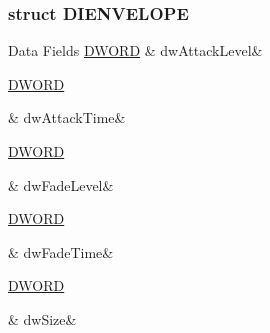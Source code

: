 \subsubsection{struct D\-I\-E\-N\-V\-E\-L\-O\-P\-E}
\begin{DoxyFields}{Data Fields}
\hypertarget{a00003_a557ca29f144d959ad65bc2cb8bd51ada}{\hyperlink{a00003_a50e15ae51c87ae06ab29c8148cb5f36c}{D\-W\-O\-R\-D}}\label{a00003_a557ca29f144d959ad65bc2cb8bd51ada}
&
dw\-Attack\-Level&
\\
\hline

\hypertarget{a00003_ae7e9a81a01a15d6ea942b8c16df1302a}{\hyperlink{a00003_a50e15ae51c87ae06ab29c8148cb5f36c}{D\-W\-O\-R\-D}}\label{a00003_ae7e9a81a01a15d6ea942b8c16df1302a}
&
dw\-Attack\-Time&
\\
\hline

\hypertarget{a00003_ad212adb36fad0fae025e1089455618a0}{\hyperlink{a00003_a50e15ae51c87ae06ab29c8148cb5f36c}{D\-W\-O\-R\-D}}\label{a00003_ad212adb36fad0fae025e1089455618a0}
&
dw\-Fade\-Level&
\\
\hline

\hypertarget{a00003_a92f5b1007dcd74e75beaafbb07f91ba8}{\hyperlink{a00003_a50e15ae51c87ae06ab29c8148cb5f36c}{D\-W\-O\-R\-D}}\label{a00003_a92f5b1007dcd74e75beaafbb07f91ba8}
&
dw\-Fade\-Time&
\\
\hline

\hypertarget{a00003_a669c5a85f5a9eb97e64ad880fadaaa2d}{\hyperlink{a00003_a50e15ae51c87ae06ab29c8148cb5f36c}{D\-W\-O\-R\-D}}\label{a00003_a669c5a85f5a9eb97e64ad880fadaaa2d}
&
dw\-Size&
\\
\hline

\end{DoxyFields}
\label{db/ddf/a00088}
\hypertarget{a00003_db/ddf/a00088}{}
